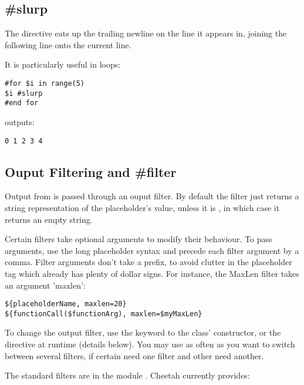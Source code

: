 \subsection{\#slurp}
\label{output.slurp}

The  directive eats up the trailing newline on the line it
appears in, joining the following line onto the current line.


It is particularly useful in  loops:
\begin{verbatim}
#for $i in range(5)
$i #slurp
#end for
\end{verbatim}
outputs:
\begin{verbatim}
0 1 2 3 4
\end{verbatim}


\subsection{Ouput Filtering and \#filter}
\label{output.filter}

Output from  is passed through an ouput filter.  By default
the filter just returns a string representation of the placeholder's value,
unless it is , in which case it returns an empty string. 

Certain filters take optional arguments to modify their behaviour.  To pass
arguments, use the long placeholder syntax and precede each filter argument by
a comma.  Filter arguments don't take a \code{\$} prefix, to avoid clutter in
the placeholder tag which already has plenty of dollar signs.  For instance,
the MaxLen filter takes an argument 'maxlen':

\begin{verbatim}
${placeholderName, maxlen=20}
${functionCall($functionArg), maxlen=$myMaxLen}
\end{verbatim}

To change the output filter, use the  keyword to the
 class' constructor, or the 
directive at runtime (details below).  You may use  as often as
you want to switch between several filters, if certain 
need one filter and other  need another.

The standard filters are in the module .  Cheetah
currently provides:

